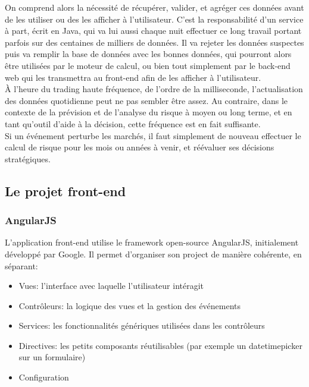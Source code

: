 \documentclass[a4paper,french,12pt]{article}
\begin{document}
		On comprend alors la nécessité de récupérer, valider, et agréger ces données avant de les utiliser ou des les afficher à l'utilisateur. C'est la responsabilité d'un service à part, écrit en Java, qui va lui aussi chaque nuit effectuer ce long travail portant parfois sur des centaines de milliers de données. Il va rejeter les données suspectes puis va remplir la base de données avec les bonnes données, qui pourront alors être utilisées par le moteur de calcul, ou bien tout simplement par le back-end web qui les transmettra au front-end afin de les afficher à l'utilisateur.~\\	
	
	\`A l'heure du trading haute fréquence, de l'ordre de la milliseconde, l'actualisation des données quotidienne peut ne pas sembler être assez. 
	Au contraire, dans le contexte de la prévision et de l'analyse du risque à moyen ou long terme, et en tant qu'outil d'aide à la décision, cette fréquence est en fait suffisante.~\\	
	
	 Si un événement perturbe les marchés, il faut simplement de nouveau effectuer le calcul de risque pour les mois ou années à venir, et réévaluer ses décisions stratégiques.

	
	\subsection{Le projet front-end}
		\subsubsection{AngularJS}

		L'application front-end utilise le framework open-source AngularJS, initialement développé par Google.
		Il permet d'organiser son project de manière cohérente, en séparant:~\\	
		
		\begin{itemize}
		\item Vues: l'interface avec laquelle l'utilisateur intéragit
		\item Contrôleurs: la logique des vues et la gestion des événements
		\item Services: les fonctionnalités génériques utilisées dans les contrôleurs
		\item Directives: les petits composants réutilisables (par exemple un datetimepicker sur un formulaire)
		\item Configuration
	\end{itemize}	~\\	
	
\end{document}
